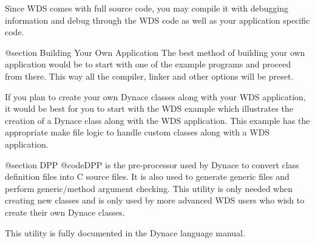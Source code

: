 Since WDS comes with full source code, you may compile it
with debugging information and debug through the WDS code
as well as your application specific code.


@section Building Your Own Application
The best method of building your own application would be to start
with one of the example programs and proceed from there.  This way
all the compiler, linker and other options will be preset.  

If you plan to create your own Dynace classes along with your WDS
application, it would be best for you to start with the WDS example
which illustrates the creation of a Dynace class along with the WDS
application.  This example has the appropriate make file logic to
handle custom classes along with a WDS application.

@section DPP
@code{DPP} is the pre-processor used by Dynace to convert class definition
files into C source files.  It is also used to generate generic files
and perform generic/method argument checking.  This utility is only needed
when creating new classes and is only used by more advanced WDS users
who wish to create their own Dynace classes.

This utility is fully documented in the Dynace language manual.



